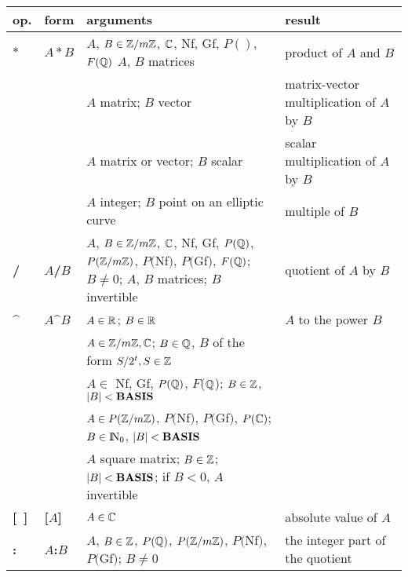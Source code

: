 \begin{tabular}{|p{0.3in}|p{0.7in}|p{2.5in}|p{1.88in}|} \hline
{\bf op.} & {\bf form} & {\bf arguments} & {\bf result} \\ \hline

{\bf $*$ }
& $A*B$ &
$A$, $B\in \mbox{$\mathbb Z$}/m\mbox{$\mathbb Z$}$, $\mbox{$\mathbb C$}$, Nf, Gf, $P()$, $F(\mbox{$\mathbb Q$})$\newline
$A$, $B$ matrices &
product of $A$ and $B$ \\
\cline{3-4} & &
$A$ matrix; $B$ vector &
matrix-vector multiplication\newline
of $A$ by $B$ \\
\cline{3-4}  & &
$A$ matrix or vector; $B$ scalar &
scalar multiplication\newline
of $A$ by $B$ \\
\cline{3-4}  & &
$A$ integer; $B$ point on an elliptic curve &
multiple of $B$ \\ \hline

{\bf / } &
{\bf $A$/$B$} &
$A$, $B\in \mbox{$\mathbb Z$}/m\mbox{$\mathbb Z$}$, $\mbox{$\mathbb C$}$, Nf, Gf, $P(\mbox{$\mathbb Q$})$, \newline
\hspace*{0.5cm} $P(\mbox{$\mathbb Z$}/m\mbox{$\mathbb Z$})$, $P($Nf$)$, $P($Gf$)$, $F(\mbox{$\mathbb Q$})$;\newline
\hspace*{5.0cm} $B\not= 0$;\newline
$A$, $B$ matrices; $B$ invertible &
quotient of $A$ by $B$  \\ \hline

{\bf \^{ } }&
{\bf $A$\^{ }$B$ } &
$A\in \mbox{$\mathbb R$}$; $B\in \mbox{$\mathbb R$}$ &
$A$ to the power $B$ \\
\cline{3-3} & &
$A\in \mbox{$\mathbb Z$} /m\mbox{$\mathbb Z$}, \mbox{$\mathbb C$}$;\newline
$B\in \mbox{$\mathbb Q$}$, $B$ of the form ${S}/{2^t}, S\in \mbox{$\mathbb Z$}$ & \\
\cline{3-3} & &
$A \in$ Nf, Gf, $P(\mbox{$\mathbb Q$})$, $F$($\mbox{$\mathbb Q$}$);\newline
$B\in \mbox{$\mathbb Z$}$, $|B| < {\rm {\bf BASIS}}$ & \\
\cline{3-3} & &
$A\in P(\mbox{$\mathbb Z$} /m\mbox{$\mathbb Z$} )$, $P($Nf$)$, $P($Gf$)$, $P(\mbox{$\mathbb C$})$;\newline
$B\in {\rm{I\!N}} _0$, $|B| < {\rm {\bf BASIS}}$ & \\
\cline{3-3} & &
$A$ square matrix; $B\in \mbox{$\mathbb Z$}$;\newline
$|B| < {\rm {\bf BASIS}}$; if $B<0$, $A$ invertible & \\ \hline

{\bf [\ ] }
& {\bf [$A$]} &
$A\in \mbox{$\mathbb C$}$ &
absolute value of $A$ \\ \hline

{\bf :} &
{\bf $A$:$B$ } &
$A$, $B\in \mbox{$\mathbb Z$}$, $P(\mbox{$\mathbb Q$})$, $P(\mbox{$\mathbb Z$}/m\mbox{$\mathbb Z$})$, $P($Nf$)$, \newline
\hspace*{0.5cm} $P($Gf$)$; \newline
\hspace*{5.0cm} $B\not= 0$ &
the  integer part of the quo\-tient \\ \hline


\end{tabular}

